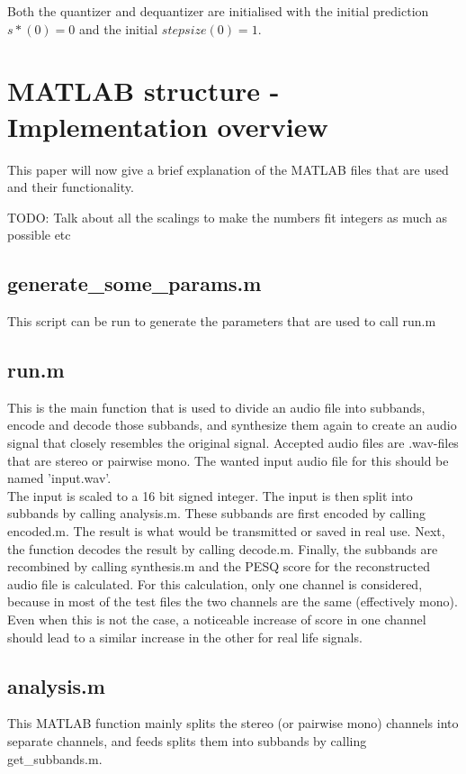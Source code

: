 \documentclass[a4paper]{article}
\begin{document}
Both the quantizer and dequantizer are initialised with the initial prediction $s*(0) = 0$ and the initial $stepsize(0) = 1$.

\section{MATLAB structure - Implementation overview}
This paper will now give a brief explanation of the MATLAB files that are used and their functionality.

TODO: Talk about all the scalings to make the numbers fit integers as much as possible etc

\subsection{generate\_some\_params.m}
This script can be run to generate the parameters that are used to call run.m

\subsection{run.m}
This is the main function that is used to divide an audio file into subbands, encode and decode those subbands, and synthesize them again to create an audio signal that closely resembles the original signal. Accepted audio files are .wav-files that are stereo or pairwise mono. The wanted input audio file for this should be named 'input.wav'.
\\
The input is scaled to a 16 bit signed integer. The input is then split into subbands by calling analysis.m. These subbands are first encoded by calling encoded.m. The result is what would be transmitted or saved in real use. Next, the function decodes the result by calling decode.m. Finally, the subbands are recombined by calling synthesis.m and the PESQ score for the reconstructed audio file is calculated. For this calculation, only one channel is considered, because in most of the test files the two channels are the same (effectively mono). Even when this is not the case, a noticeable increase of score in one channel should lead to a similar increase in the other for real life signals.

\subsection{analysis.m}
This MATLAB function mainly splits the stereo (or pairwise mono) channels into separate channels, and feeds splits them into subbands by calling get\_subbands.m.
\end{document}

